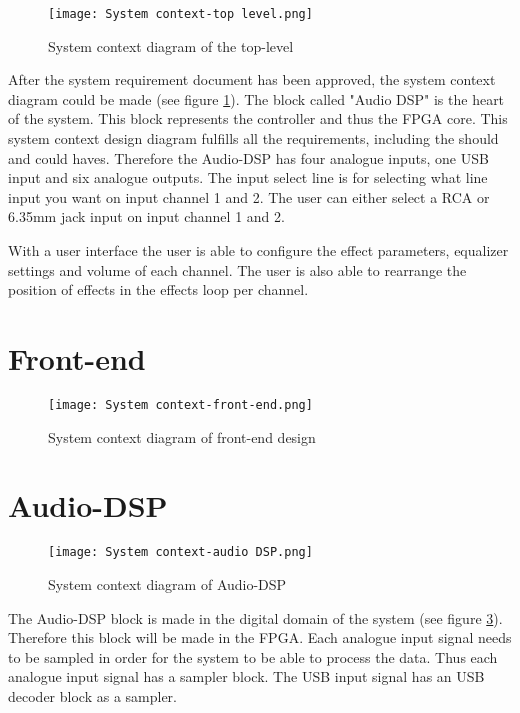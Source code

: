 \begin{figure}[ht]
    \texttt{[image: System context-top level.png]}
    \caption{System context diagram of the top-level}
    \label{fig:sys-context-top}
\end{figure}

After the system requirement document has been approved, the system context diagram could be made (see figure \ref{fig:sys-context-top}).
The block called "Audio DSP" is the heart of the system.
This block represents the controller and thus the FPGA core.
This system context design diagram fulfills all the requirements, including the should and could haves.
Therefore the Audio-DSP has four analogue inputs, one USB input and six analogue outputs.
The input select line is for selecting what line input you want on input channel 1 and 2.
The user can either select a RCA or 6.35mm jack input on input channel 1 and 2.

With a user interface the user is able to configure the effect parameters, equalizer settings and volume of each channel.
The user is also able to rearrange the position of effects in the effects loop per channel.

\section{Front-end}
\begin{figure}[ht]
    \texttt{[image: System context-front-end.png]}
    \caption{System context diagram of front-end design}
    \label{fig:system-context-front-end}
\end{figure}

\section{Audio-DSP}
\begin{figure}[ht]
    \texttt{[image: System context-audio DSP.png]}
    \caption{System context diagram of Audio-DSP}
    \label{fig:sys-context-audio-dsp}
\end{figure}

The Audio-DSP block is made in the digital domain of the system (see figure \ref{fig:sys-context-audio-dsp}). 
Therefore this block will be made in the FPGA. Each analogue input signal needs to be sampled in order for the system to be able to process the data. 
Thus each analogue input signal has a sampler block. The USB input signal has an USB decoder block as a sampler. 

